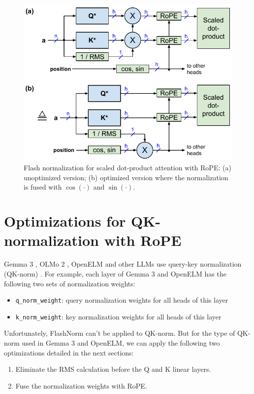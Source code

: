\documentclass{article}
\def\cosi{\cos{(\cdot)}}              %
\def\sini{\sin{(\cdot)}}              %
\begin{document}
\begin{figure}[h!] \centering
  \includegraphics[scale=0.9]{../doc/fig/flashNorm_fig5.pdf}
  \caption{Flash normalization for scaled dot-product attention with RoPE: (a) unoptimized version; (b) optimized version where the normalization is fused with $\cosi$ and $\sini$.}
\label{fig5} \end{figure}

\section{Optimizations for QK-normalization with RoPE}
Gemma 3 \citep{gemma3}, OLMo 2 \citep{olmo2}, OpenELM \citep{openelm} and other LLMs use query-key normalization (QK-norm) \citep{QKnorm}. For example, each layer of Gemma 3 and OpenELM has the following two sets of normalization weights:
\begin{itemize}[topsep=-1pt]
  \item \verb+q_norm_weight+: query normalization weights for all heads of this layer
  \item \verb+k_norm_weight+: key normalization weights for all heads of this layer
\end{itemize}
Unfortunately, FlashNorm can't be applied to QK-norm. But for the type of QK-norm used in Gemma 3 and OpenELM, we can apply the following two optimizations detailed in the next sections:
\begin{enumerate}[topsep=-1pt]
  \item Eliminate the RMS calculation before the Q and K linear layers.
  \item Fuse the normalization weights with RoPE.
\end{enumerate}
\end{document}
